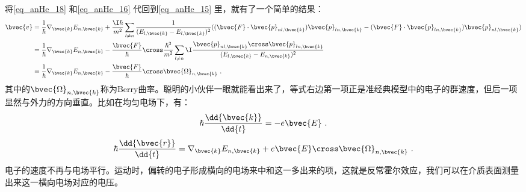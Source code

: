 将\autoref{eq_anHe_18} 和\autoref{eq_anHe_16} 代回到\autoref{eq_anHe_15} 里，就有了一个简单的结果：
\begin{equation}
\begin{aligned}
\bvec{v}&=\frac{1}{\hbar}\nabla_{\bvec{k}}E_{n,\bvec{k}}+\frac{\I\hbar}{m^2}\sum_{l\neq n}\frac{1}{(E_{l,\bvec{k}}-E_{l,\bvec{k}})^2}((\bvec{F}\cdot\bvec{p}_{nl,\bvec{k}})\bvec{p}_{ln,\bvec{k}}-(\bvec{F}\cdot\bvec{p}_{ln,\bvec{k}})\bvec{p}_{nl,\bvec{k}})\\
&=\frac{1}{\hbar}\nabla_{\bvec{k}}E_{n,\bvec{k}}-\frac{\bvec{F}}{\hbar}\cross\frac{\hbar^2}{m^2}\sum_{l\neq n}\I\frac{\bvec{p}_{nl,\bvec{k}}\cross\bvec{p}_{ln,\bvec{k}}}{(E_{l,\bvec{k}}-E_{n,\bvec{k}})^2}\\
&=\frac{1}{\hbar}\nabla_{\bvec{k}}E_{n,\bvec{k}}-\frac{\bvec{F}}{\hbar}\cross\bvec{\Omega}_{n,\bvec{k}}~.
\end{aligned}
\end{equation}
其中的$\bvec{\Omega}_{n,\bvec{k}}$称为Berry曲率。聪明的小伙伴一眼就能看出来了，等式右边第一项正是准经典模型中的电子的群速度，但后一项显然与外力的方向垂直。比如在均匀电场下，有：
\begin{equation}
\hbar\frac{\dd{\bvec{k}}}{\dd{t}}=-e\bvec{E}~.
\end{equation}
\begin{equation}
\hbar\frac{\dd{\bvec{r}}}{\dd{t}}=\nabla_{\bvec{k}}E_{n,\bvec{k}}+e\bvec{E}\cross\bvec{\Omega}_{n,\bvec{k}}~.
\end{equation}
电子的速度不再与电场平行。运动时，偏转的电子形成横向的电场来中和这一多出来的项，这就是反常霍尔效应，我们可以在介质表面测量出来这一横向电场对应的电压。






